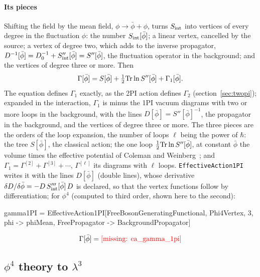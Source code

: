 \documentclass[11pt,a4paper]{article}
\newcommand{\formula}[1]{\IfFileExists{figures/formula_#1.tex}{}{\text{\textcolor{red}{[missing: \detokenize{#1}]}}}}
\newcommand{\formulasplit}[1]{\IfFileExists{figures/formula_#1_split.tex}{}{\formula{#1}}}
\newcommand{\formulalines}[1]{\IfFileExists{figures/formula_#1_lines.tex}{}{\formulasplit{#1}}}
\newcommand{\pkg}[1]{\texttt{#1}}
\begin{document}
\paragraph{Its pieces} Shifting the field by the mean field, $\phi\to\bar\phi+\phi$, turns $S_{\rm int}$ into vertices of every
degree in the fluctuation $\phi$: the number $S_{\rm int}[\bar\phi]$; a linear vertex, cancelled by the source; a vertex of degree
two, which adds to the inverse propagator, $D^{-1}[\bar\phi]=D_0^{-1}+S_{\rm int}''[\bar\phi]=S''[\bar\phi]$, the fluctuation operator in the
background; and the vertices of degree three or more. Then
\[
\Gamma[\bar\phi]=S[\bar\phi]+\tfrac12{\rm Tr}\ln S''[\bar\phi]+\Gamma_1[\bar\phi].
\]
The equation defines $\Gamma_1$ exactly, as the 2PI action defines $\Gamma_2$ (section~\ref{sec:twopi}); expanded in the
interaction, $\Gamma_1$ is minus the 1PI vacuum diagrams with two or more loops in the background, with the lines
$D[\bar\phi]=S''[\bar\phi]^{-1}$, the propagator in the background, and the vertices of degree three or more. The three pieces are
the orders of the loop expansion, the number of loops $\ell$ being the power of $\hbar$: the tree $S[\bar\phi]$, the classical
action; the one loop $\frac12{\rm Tr}\ln S''[\bar\phi]$, at constant $\bar\phi$ the volume times the effective potential of Coleman
and Weinberg~\cite{ColemanWeinberg1973}; and $\Gamma_1=\Gamma^{[2]}+\Gamma^{[3]}+\cdots$, $\Gamma^{[\ell]}$ its diagrams with $\ell$ loops.
\pkg{EffectiveAction1PI} writes it with the lines $D[\bar\phi]$ (double lines), whose derivative $\delta D/\delta\bar\phi=-D\,S_{\rm int}'''[\bar\phi]\,D$ is declared, so
that the vertex functions follow by differentiation; for $\phi^4$ (computed to third order, shown here to the second):
\begin{code}
gamma1PI = EffectiveAction1PI[FreeBosonGeneratingFunctional, Phi4Vertex, 3,
    phi -> phiMean, FreePropagator -> BackgroundPropagator]
\end{code}
\begin{gather*}
\Gamma[\bar\phi]=\formulalines{ea_gamma_1pi}
\end{gather*}

\subsection{\texorpdfstring{$\phi^4$}{phi4} theory to \texorpdfstring{$\lambda^3$}{lambda3}}\label{sec:onepiphi4}
\end{document}
